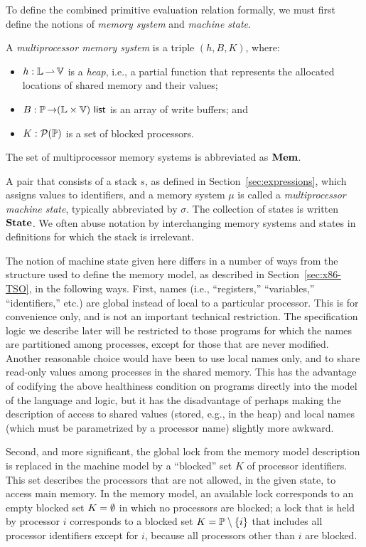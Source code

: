\documentclass[11pt]{report}         %
\begin{document}
To define the combined primitive evaluation relation formally, we must first define the notions of \emph{memory system} and \emph{machine state}. 
\begin{definition}
A \emph{multiprocessor memory system} is a triple $(h,B,K)$, where: \begin{itemize}
      \item $h : \mathbb{L} \operatorname{\rightharpoonup} \mathbb{V}$ is a \emph{heap}, i.e., a partial function that represents the allocated locations of shared memory and their values; 
      \item $B : \mathbb{P} \operatorname{\rightarrow} (\mathbb{L} \times \mathbb{V})~\mathsf{list}$ is an array of write buffers; and
      \item $K : \mathcal{P}(\mathbb{P})$ is a set of blocked processors.
\end{itemize} 
\end{definition} 
The set of multiprocessor memory systems is abbreviated as $\mathbf{Mem}$.

A pair that consists of a stack $s$, as defined in Section~\ref{sec:expressions}, which assigns values to identifiers, and a memory system $\mu$ is called a \emph{multiprocessor machine state}, typically abbreviated by $\sigma$. The collection of states is written $\mathbf{State}$. We often abuse notation by interchanging memory systems and states in definitions for which the stack is irrelevant. 

The notion of machine state given here differs in a number of ways from the structure used to define the memory model, as described in Section~\ref{sec:x86-TSO}, in the following ways. First, names (i.e., ``registers,'' ``variables,'' ``identifiers,'' etc.) are global instead of local to a particular processor. This is for convenience only, and is not an important technical restriction. The specification logic we describe later will be restricted to those programs for which the names are partitioned among processes, except for those that are never modified. Another reasonable choice would have been to use local names only, and to share read-only values among processes in the shared memory. This has the advantage of codifying the above healthiness condition on programs directly into the model of the language and logic, but it has the disadvantage of perhaps making the description of access to shared values (stored, e.g., in the heap) and local names (which must be parametrized by a processor name) slightly more awkward.

Second, and more significant, the global lock from the memory model description is replaced in the machine model by a ``blocked'' set $K$ of processor identifiers. This set describes the processors that are not allowed, in the given state, to access main memory. In the memory model, an available lock corresponds to an empty blocked set $K = \operatorname{\emptyset}$ in which no processors are blocked; a lock that is held by processor $i$ corresponds to a blocked set $K = \mathbb{P} \setminus \left\lbrace i \right\rbrace$ that includes all processor identifiers except for $i$, because all processors other than $i$ are blocked. 
\end{document}
